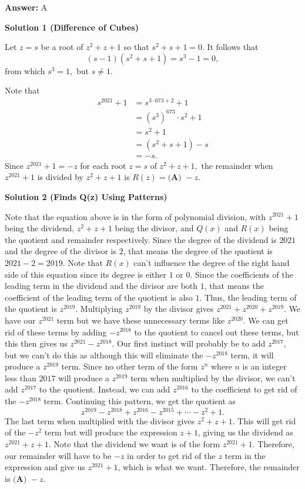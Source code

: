 \begin{enumerate}
 \textbf{Answer: }A



\textbf{Solution 1 (Difference of Cubes)}

Let $z=s$ be a root of $z^2+z+1$ so that $s^2+s+1=0.$ It follows that 
 \[(s-1)\left(s^2+s+1\right)=s^3-1=0,\] from which $s^3=1,$ but $s\neq1.$

 Note that
 \begin{align*} s^{2021}+1 &= s^{3\cdot673+2}+1 \\ &= (s^3)^{673}\cdot s^2+1 \\ &= s^2+1 \\ &= \left(s^2+s+1\right)-s \\ &= -s. \end{align*}
Since $z^{2021}+1=-z$ for each root $z=s$ of $z^2+z+1,$ the remainder when $z^{2021}+1$ is divided by $z^2+z+1$ is $R(z)=\boxed{\textbf{(A) }{-}z}.$




\textbf{Solution 2 (Finds Q(z) Using Patterns)}

Note that the equation above is in the form of polynomial division, with $z^{2021}+1$ being the dividend, $z^2+z+1$ being the divisor, and $Q(x)$ and $R(x)$ being the quotient and remainder respectively. Since the degree of the dividend is $2021$ and the degree of the divisor is $2$, that means the degree of the quotient is $2021-2 = 2019$. Note that $R(x)$ can't influence the degree of the right hand side of this equation since its degree is either $1$ or $0$. Since the coefficients of the leading term in the dividend and the divisor are both $1$, that means the coefficient of the leading term of the quotient is also $1$. Thus, the leading term of the quotient is $z^{2019}$. Multiplying $z^{2019}$ by the divisor gives $z^{2021}+z^{2020}+z^{2019}$. We have our $z^{2021}$ term but we have these unnecessary terms like $z^{2020}$. We can get rid of these terms by adding $-z^{2018}$ to the quotient to cancel out these terms, but this then gives us $z^{2021}-z^{2018}$. Our first instinct will probably be to add $z^{2017}$, but we can't do this as although this will eliminate the $-z^{2018}$ term, it will produce a $z^{2019}$ term. Since no other term of the form $z^n$ where $n$ is an integer less than $2017$ will produce a $z^{2019}$ term when multiplied by the divisor, we can't add $z^{2017}$ to the quotient. Instead, we can add $z^{2016}$ to the coefficient to get rid of the $-z^{2018}$ term. Continuing this pattern, we get the quotient as 
 \[z^{2019}-z^{2018}+z^{2016}-z^{2015}+\cdots-z^2+1.\]The last term when multiplied with the divisor gives $z^2+z+1$. This will get rid of the $-z^2$ term but will produce the expression $z+1$, giving us the dividend as $z^{2021}+z+1$. Note that the dividend we want is of the form $z^{2021}+1$. Therefore, our remainder will have to be $-z$ in order to get rid of the $z$ term in the expression and give us $z^{2021}+1$, which is what we want. Therefore, the remainder is $\boxed{\textbf{(A) }{-}z}.$





\end{enumerate}
